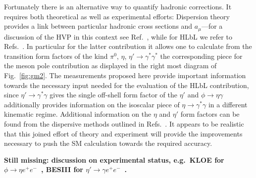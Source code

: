 \documentclass[preprint,12pt,3p]{elsarticle}
\newcommand{\0}{}
\begin{document}
Fortunately there is an alternative way to quantify hadronic corrections. It requires both
theoretical as well as experimental efforts:
Dispersion theory provides a link between particular hadronic cross sections
and $a_\mu$---for a discussion of the HVP in this context see Ref.~\cite{Jegerlehner:2009ry}, while 
for HLbL we refer to Refs.~\cite{Colangelo:2014dfa,Pauk:2014rfa,Colangelo:2014pva,Colangelo:2015ama}.  
In particular for the latter contribution it allows one to calculate from the transition
form factors of the kind $\pi^0$, $\eta$, $\eta'\to \gamma^*\gamma^*$ 
the corresponding piece for the meson pole contribution as displayed in the
right most diagram of Fig.~\ref{fig:gm2}.
The measurements proposed here provide important information towards
the necessary input needed for the evaluation of the HLbL contribution, since
$\eta'\to \gamma^*\gamma$ gives the single off-shell form factor of the $\eta'$
and $\phi\to \eta\gamma$ additionally provides information on the isoscalar
piece of $\eta\to \gamma^*\gamma$ in a different kinematic regime.
Additional information on the  $\eta$ and
$\eta'$ form factors can be found from the dispersive methods outlined in
Refs.~\cite{Adlarson:2011xb,Stollenwerk:2011zz,Hanhart:2013vba,Kubis:2015sga,Xiao:2015uva}.
It  appears to be realistic that this joined effort of theory and experiment
will provide the improvements necessary to push the SM calculation towards
the required accuracy.

{\bf Still missing: discussion on experimental status, e.g.\ KLOE for $\phi\to\eta e^+e^-$~\cite{Babusci:2014ldz},
BESIII for $\eta'\to\gamma e^+e^-$~\cite{Ablikim:2015wnx}.}
\end{document}
